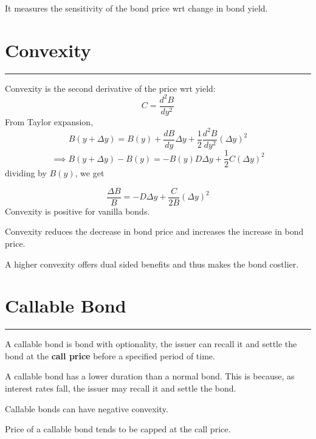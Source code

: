 \documentclass[DIV=15, fleqn, oneside, 10pt]{scrartcl}
\theoremstyle{clean}
\newcommand{\sep}{%
  \par\medskip
  \hrule
  \bigskip
}
\begin{document}
It measures the sensitivity of the bond price wrt change in bond yield.

\section*{Convexity}
\sep
Convexity is the second derivative of the price wrt yield:
\[C = \frac{d^2 B}{dy^2}\]
From Taylor expansion,
\[B(y + \Delta y) = B(y) + \frac{dB}{dy} \Delta y + \frac{1}{2} \frac{d^2 B}{dy^2} (\Delta y)^2\]
\[\implies B(y + \Delta y) - B(y) = -B(y)D \Delta y + \frac{1}{2}C (\Delta y)^2\]
dividing by $B(y)$, we get

\begin{equation}
  \frac{\Delta B}{B} = -D \Delta y + \frac{C}{2B} (\Delta y)^2
\end{equation}
Convexity is positive for vanilla bonds. 

Convexity reduces the decrease in bond price and increases
the increase in bond price.

A higher convexity offers dual sided benefits and thus makes the bond costlier.
\section*{Callable Bond}
\sep
A callable bond is bond with optionality, the issuer can recall it and settle the bond at the
\textbf{call price} before a specified period of time. 

A callable bond has a lower duration
than a normal bond. This is because, as interest rates fall, the issuer may recall it and settle
the bond.

Callable bonds can have negative convexity. 

Price of a callable bond tends to be capped at the call price.
\end{document}
